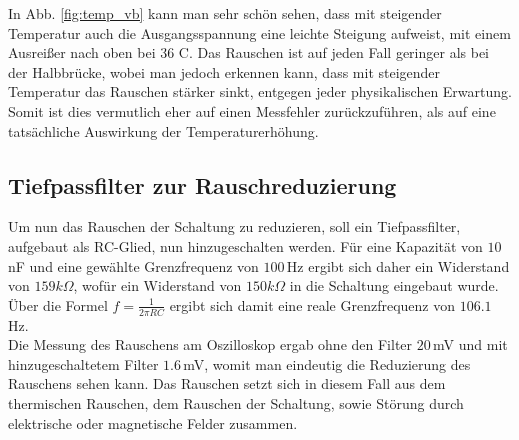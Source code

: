 In Abb. \ref{fig:temp_vb} kann man sehr schön sehen, dass mit steigender Temperatur auch die Ausgangsspannung eine leichte Steigung aufweist, mit einem Ausreißer nach oben bei 36 C. Das Rauschen ist auf jeden Fall geringer als bei der Halbbrücke, wobei man jedoch erkennen kann, dass mit steigender Temperatur das Rauschen stärker sinkt, entgegen jeder physikalischen Erwartung. Somit ist dies vermutlich eher auf einen Messfehler zurückzuführen, als auf eine tatsächliche Auswirkung der Temperaturerhöhung.

\subsection{Tiefpassfilter zur Rauschreduzierung}
Um nun das Rauschen der Schaltung zu reduzieren, soll ein Tiefpassfilter, aufgebaut als RC-Glied, nun hinzugeschalten werden. Für eine Kapazität von $10\,$nF und eine gewählte Grenzfrequenz von $100\,$Hz ergibt sich daher ein Widerstand von $159k\Omega$, wofür ein Widerstand von $150k\Omega$ in die Schaltung eingebaut wurde. Über die Formel $f=\frac{1}{2\pi R C}$ ergibt sich damit eine reale Grenzfrequenz von $106.1\,$Hz. \\
Die Messung des Rauschens am Oszilloskop ergab ohne den Filter $20\,$mV und mit hinzugeschaltetem Filter $1.6\,$mV, womit man eindeutig die Reduzierung des Rauschens sehen kann. Das Rauschen setzt sich in diesem Fall aus dem thermischen Rauschen, dem Rauschen der Schaltung, sowie Störung durch elektrische oder magnetische Felder zusammen.
